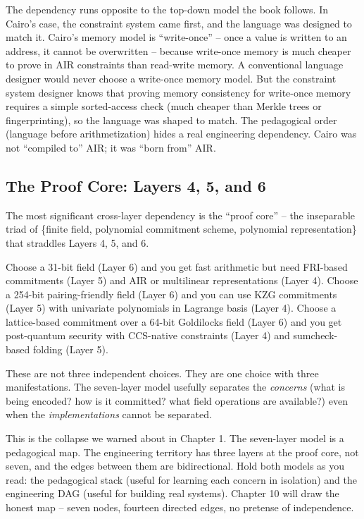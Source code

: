 \documentclass[
  11pt,
  openany]{report}
\begin{document}
The dependency runs opposite to the top-down model the book follows. In Cairo's
case, the constraint system came first, and the language was designed to match
it. Cairo's memory model is ``write-once'' -- once a value is written to an
address, it cannot be overwritten -- because write-once memory is much cheaper
to prove in AIR constraints than read-write memory. A conventional language
designer would never choose a write-once memory model. But the constraint system
designer knows that proving memory consistency for write-once memory requires a
simple sorted-access check (much cheaper than Merkle trees or fingerprinting),
so the language was shaped to match. The pedagogical order (language before
arithmetization) hides a real engineering dependency. Cairo was not ``compiled
to'' AIR; it was ``born from'' AIR.

\subsection{The Proof Core: Layers 4, 5, and
6}\label{the-proof-core-layers-4-5-and-6}

The most significant cross-layer dependency is the ``proof core'' -- the
inseparable triad of \{finite field, polynomial commitment scheme, polynomial
representation\} that straddles Layers 4, 5, and 6.

Choose a 31-bit field (Layer 6) and you get fast arithmetic but need FRI-based
commitments (Layer 5) and AIR or multilinear representations (Layer 4). Choose a
254-bit pairing-friendly field (Layer 6) and you can use KZG commitments (Layer
5) with univariate polynomials in Lagrange basis (Layer 4). Choose a
lattice-based commitment over a 64-bit Goldilocks field (Layer 6) and you get
post-quantum security with CCS-native constraints (Layer 4) and sumcheck-based
folding (Layer 5).

These are not three independent choices. They are one choice with three
manifestations. The seven-layer model usefully separates the \emph{concerns}
(what is being encoded? how is it committed? what field operations are
available?) even when the \emph{implementations} cannot be separated.

This is the collapse we warned about in Chapter 1. The seven-layer model is a
pedagogical map. The engineering territory has three layers at the proof core,
not seven, and the edges between them are bidirectional. Hold both models as you
read: the pedagogical stack (useful for learning each concern in isolation) and
the engineering DAG (useful for building real systems). Chapter 10 will draw the
honest map -- seven nodes, fourteen directed edges, no pretense of independence.
\end{document}
